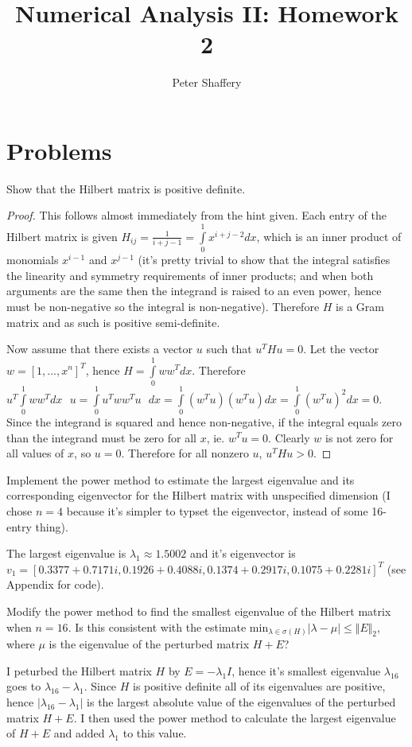 \documentclass[10pt,a4paper]{article}
\newenvironment{problem}[2][Problem]{\begin{trivlist}
\item[\hskip \labelsep {\bfseries #1}\hskip \labelsep {\bfseries #2.}]}{\end{trivlist}}
\begin{document}
\author{Peter Shaffery}
\title{Numerical Analysis II: Homework 2}
\maketitle
\section{Problems}
\begin{problem}{1a}
Show that the Hilbert matrix is positive definite.
\end{problem}

\begin{proof}
This follows almost immediately from the hint given.  Each entry of the Hilbert matrix is given $H_{ij} = \frac{1}{i+j-1} = \int\limits_0^1 x^{i+j-2} dx$, which is an inner product of monomials $x^{i-1}$ and $x^{j-1}$ (it's pretty trivial to show that the integral satisfies the linearity and symmetry requirements of inner products; and when both arguments are the same then the integrand is raised to an even power, hence must be non-negative so the integral is non-negative).  Therefore $H$ is a Gram matrix and as such is positive semi-definite.

Now assume that there exists a vector $u$ such that $u^T H u = 0$.  Let the vector $w = [1, ..., x^n]^T$, hence $H = \int\limits_0^1 w w^T dx$.  Therefore $u^T \int\limits_0^1 w w^T dx \text{ } u = \int\limits_0^1 u^T w w^T u \text{ } dx = \int\limits_0^1 (w^T u) (w^T u) dx = \int\limits_0^1 (w^T u)^2 dx = 0$.  Since the integrand is squared and hence non-negative, if the integral equals zero than the integrand must be zero for all $x$, ie. $w^T u = 0$.  Clearly $w$ is not zero for all values of $x$, so $u = 0$.  Therefore for all nonzero $u$, $u^T H u > 0$.
\end{proof}

\begin{problem}{1b}
Implement the power method to estimate the largest eigenvalue and its corresponding eigenvector for the Hilbert matrix with unspecified dimension (I chose $n=4$ because it's simpler to typset the eigenvector, instead of some 16-entry thing).
\end{problem}
The largest eigenvalue is $\lambda_1 \approx 1.5002$ and it's eigenvector is $v_1 = [0.3377+0.7171i, 0.1926+0.4088i, 0.1374+0.2917i,0.1075+0.2281i]^T$ (see Appendix for code).

\begin{problem}{1c}
Modify the power method to find the smallest eigenvalue of the Hilbert matrix when $n=16$.  Is this consistent with the estimate $\text{min}_{\lambda \in \sigma(H)} |\lambda - \mu| \leq \Vert E \Vert_2$, where $\mu$ is the eigenvalue of the perturbed matrix $H + E$?
\end{problem}
I peturbed the Hilbert matrix $H$ by $E = -\lambda_1 I$, hence it's smallest eigenvalue $\lambda_{16}$ goes to $\lambda_16 - \lambda_1$.  Since $H$ is positive definite all of its eigenvalues are positive, hence $|\lambda_{16} - \lambda_1|$ is the largest absolute value of the eigenvalues of the perturbed matrix $H+E$.  I then used the power method to calculate the largest eigenvalue of $H + E$ and added $\lambda_1$ to this value.
\end{document}
